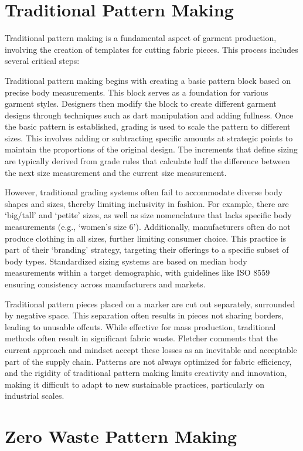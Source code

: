 \section{Traditional Pattern Making}
Traditional pattern making is a fundamental aspect of garment production, involving the creation of templates for cutting fabric pieces. This process includes several critical steps:

Traditional pattern making begins with creating a basic pattern block based on precise body measurements. This block serves as a foundation for various garment styles. Designers then modify the block to create different garment designs through techniques such as dart manipulation and adding fullness. Once the basic pattern is established, grading is used to scale the pattern to different sizes. This involves adding or subtracting specific amounts at strategic points to maintain the proportions of the original design. The increments that define sizing are typically derived from grade rules that calculate half the difference between the next size measurement and the current size measurement.

However, traditional grading systems often fail to accommodate diverse body shapes and sizes, thereby limiting inclusivity in fashion. For example, there are ‘big/tall’ and ‘petite’ sizes, as well as size nomenclature that lacks specific body measurements (e.g., ‘women’s size 6’). Additionally, manufacturers often do not produce clothing in all sizes, further limiting consumer choice. This practice is part of their ‘branding’ strategy, targeting their offerings to a specific subset of body types. Standardized sizing systems are based on median body measurements within a target demographic, with guidelines like ISO 8559 ensuring consistency across manufacturers and markets.

Traditional pattern pieces placed on a marker are cut out separately, surrounded by negative space. This separation often results in pieces not sharing borders, leading to unusable offcuts. While effective for mass production, traditional methods often result in significant fabric waste. Fletcher comments that the current approach and mindset accept these losses as an inevitable and acceptable part of the supply chain. Patterns are not always optimized for fabric efficiency, and the rigidity of traditional pattern making limits creativity and innovation, making it difficult to adapt to new sustainable practices, particularly on industrial scales.


\section{Zero Waste Pattern Making}
